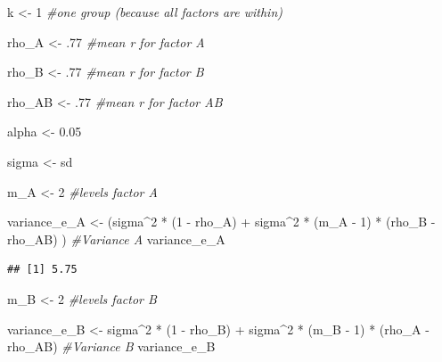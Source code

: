 \documentclass[
]{book}
\newenvironment{Shaded}{\begin{snugshade}}{\end{snugshade}}
\newcommand{\CommentTok}[1]{\textcolor[rgb]{0.56,0.35,0.01}{\textit{#1}}}
\newcommand{\DecValTok}[1]{\textcolor[rgb]{0.00,0.00,0.81}{#1}}
\newcommand{\FloatTok}[1]{\textcolor[rgb]{0.00,0.00,0.81}{#1}}
\newcommand{\NormalTok}[1]{#1}
\newcommand{\OtherTok}[1]{\textcolor[rgb]{0.56,0.35,0.01}{#1}}
\newcommand{\SpecialCharTok}[1]{\textcolor[rgb]{0.00,0.00,0.00}{#1}}
\begin{document}
\begin{Shaded}
\begin{Highlighting}[]
\NormalTok{k }\OtherTok{\textless{}{-}} \DecValTok{1} \CommentTok{\#one group (because all factors are within)}

\NormalTok{rho\_A }\OtherTok{\textless{}{-}}\NormalTok{ .}\DecValTok{77} \CommentTok{\#mean r for factor A}

\NormalTok{rho\_B }\OtherTok{\textless{}{-}}\NormalTok{ .}\DecValTok{77} \CommentTok{\#mean r for factor B}

\NormalTok{rho\_AB }\OtherTok{\textless{}{-}}\NormalTok{ .}\DecValTok{77} \CommentTok{\#mean r for factor AB}

\NormalTok{alpha }\OtherTok{\textless{}{-}} \FloatTok{0.05}

\NormalTok{sigma }\OtherTok{\textless{}{-}}\NormalTok{ sd}

\NormalTok{m\_A }\OtherTok{\textless{}{-}} \DecValTok{2} \CommentTok{\#levels factor A}

\NormalTok{variance\_e\_A }\OtherTok{\textless{}{-}}\NormalTok{ (sigma}\SpecialCharTok{\^{}}\DecValTok{2} \SpecialCharTok{*}\NormalTok{ (}\DecValTok{1} \SpecialCharTok{{-}}\NormalTok{ rho\_A) }\SpecialCharTok{+} 
\NormalTok{  sigma}\SpecialCharTok{\^{}}\DecValTok{2} \SpecialCharTok{*}\NormalTok{ (m\_A }\SpecialCharTok{{-}} \DecValTok{1}\NormalTok{) }\SpecialCharTok{*}\NormalTok{ (rho\_B }\SpecialCharTok{{-}}\NormalTok{ rho\_AB) )}
\CommentTok{\#Variance A}
\NormalTok{variance\_e\_A}
\end{Highlighting}
\end{Shaded}

\begin{verbatim}
## [1] 5.75
\end{verbatim}

\begin{Shaded}
\begin{Highlighting}[]
\NormalTok{m\_B }\OtherTok{\textless{}{-}} \DecValTok{2} \CommentTok{\#levels factor B}

\NormalTok{variance\_e\_B }\OtherTok{\textless{}{-}}\NormalTok{ sigma}\SpecialCharTok{\^{}}\DecValTok{2} \SpecialCharTok{*}\NormalTok{ (}\DecValTok{1} \SpecialCharTok{{-}}\NormalTok{ rho\_B) }\SpecialCharTok{+} 
\NormalTok{  sigma}\SpecialCharTok{\^{}}\DecValTok{2} \SpecialCharTok{*}\NormalTok{ (m\_B }\SpecialCharTok{{-}} \DecValTok{1}\NormalTok{) }\SpecialCharTok{*}\NormalTok{ (rho\_A }\SpecialCharTok{{-}}\NormalTok{ rho\_AB)}
\CommentTok{\#Variance B}
\NormalTok{variance\_e\_B}
\end{Highlighting}
\end{Shaded}
\end{document}
